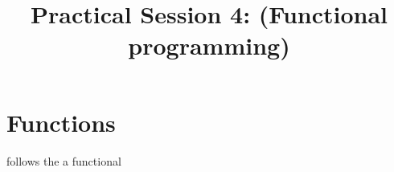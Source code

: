 \documentclass{../../../tp}
\title{Practical Session 4: \scheme (Functional programming)}
\author{}
\begin{document}
	
	\maketitle





\section{Functions}

\scheme follows the a functional 
\end{document}
